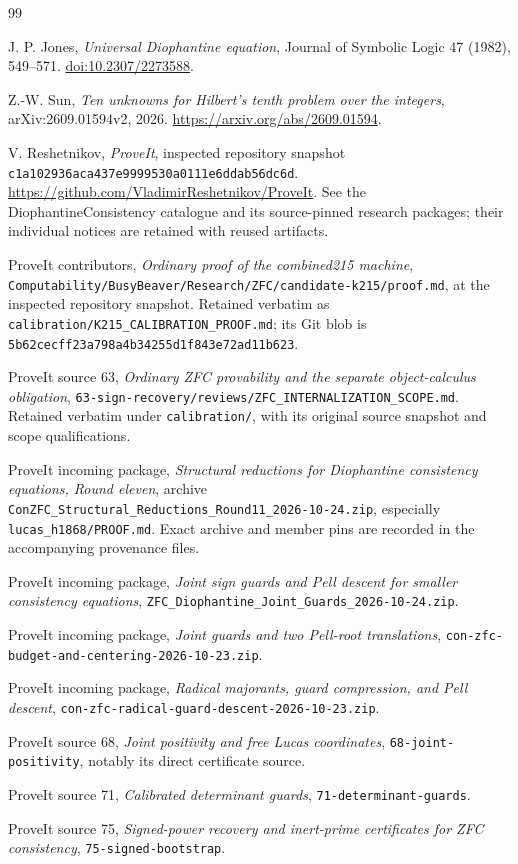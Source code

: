 \documentclass[11pt]{article}
\theoremstyle{definition}
\theoremstyle{remark}
\newcommand{\file}[1]{\nolinkurl{#1}}
\begin{document}
\begin{thebibliography}{99}
\raggedright
{}
J. P. Jones, \emph{Universal Diophantine equation}, Journal of Symbolic
Logic 47 (1982), 549--571.
\href{https://doi.org/10.2307/2273588}{doi:10.2307/2273588}.

Z.-W. Sun, \emph{Ten unknowns for Hilbert's tenth problem over the integers},
arXiv:2609.01594v2, 2026.
\url{https://arxiv.org/abs/2609.01594}.

V. Reshetnikov, \emph{ProveIt}, inspected repository snapshot
\file{c1a102936aca437e9999530a0111e6ddab56dc6d}.
\url{https://github.com/VladimirReshetnikov/ProveIt}.
See the DiophantineConsistency catalogue and its source-pinned research
packages; their individual notices are retained with reused artifacts.

ProveIt contributors, \emph{Ordinary proof of the combined215 machine},
\file{Computability/BusyBeaver/Research/ZFC/candidate-k215/proof.md},
at the inspected repository snapshot. Retained verbatim as
\file{calibration/K215_CALIBRATION_PROOF.md}; its Git blob is
\file{5b62cecff23a798a4b34255d1f843e72ad11b623}.

ProveIt source 63, \emph{Ordinary ZFC provability and the separate
object-calculus obligation},
\file{63-sign-recovery/reviews/ZFC_INTERNALIZATION_SCOPE.md}.
Retained verbatim under \file{calibration/}, with its original source
snapshot and scope qualifications.

ProveIt incoming package,
\emph{Structural reductions for Diophantine consistency equations,
Round eleven}, archive
\file{ConZFC_Structural_Reductions_Round11_2026-10-24.zip},
especially \file{lucas_h1868/PROOF.md}. Exact archive and member pins are
recorded in the accompanying provenance files.

ProveIt incoming package,
\emph{Joint sign guards and Pell descent for smaller consistency equations},
\file{ZFC_Diophantine_Joint_Guards_2026-10-24.zip}.

ProveIt incoming package,
\emph{Joint guards and two Pell-root translations},
\file{con-zfc-budget-and-centering-2026-10-23.zip}.

ProveIt incoming package,
\emph{Radical majorants, guard compression, and Pell descent},
\file{con-zfc-radical-guard-descent-2026-10-23.zip}.

ProveIt source 68, \emph{Joint positivity and free Lucas coordinates},
\file{68-joint-positivity}, notably its direct certificate source.

ProveIt source 71, \emph{Calibrated determinant guards},
\file{71-determinant-guards}.

ProveIt source 75, \emph{Signed-power recovery and inert-prime certificates
for ZFC consistency}, \file{75-signed-bootstrap}.
\end{thebibliography}
\end{document}
